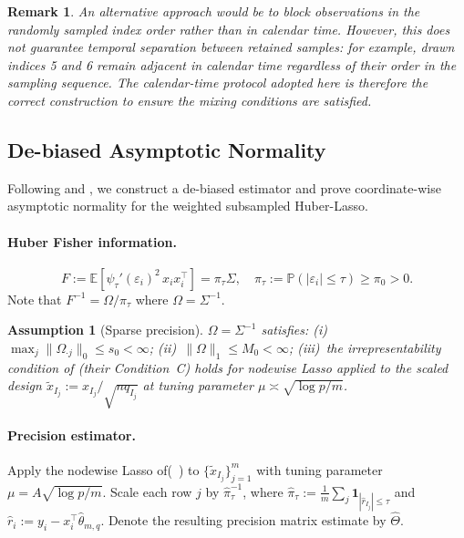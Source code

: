 \documentclass[10pt]{article}
\newtheorem{remark}[theorem]{Remark}
\newtheorem{assumption}{Assumption}
\newcommand{\E}{\mathbb{E}}
\newcommand{\Prob}{\mathbb{P}}
\newcommand{\hth}{\hat{\theta}}
\newcommand{\hTh}{\hat{\Theta}}
\begin{document}
\begin{remark}
An alternative approach would be to block observations in the randomly sampled
index order rather than in calendar time. However, this does not guarantee
temporal separation between retained samples: for example, drawn indices 5 and 6
remain adjacent in calendar time regardless of their order in the sampling
sequence. The calendar-time protocol adopted here is therefore the correct
construction to ensure the mixing conditions are satisfied.
\end{remark}

\subsection{De-biased Asymptotic Normality}
\label{subsec:debiased}

Following \citet{vandegeer2014} and \citet{javanmard2014}, we construct a
de-biased estimator and prove coordinate-wise asymptotic normality for the
weighted subsampled Huber-Lasso.

\paragraph{Huber Fisher information.}
\begin{equation}\label{eq:F}
  F := \E[\psi_\tau'(\varepsilon_i)^2\,x_ix_i^\top]
     = \pi_\tau\Sigma,\quad
  \pi_\tau:=\Prob(|\varepsilon_i|\le\tau)\ge\pi_0>0.
\end{equation}
Note that $F^{-1}=\Omega/\pi_\tau$ where $\Omega=\Sigma^{-1}$.

\begin{assumption}[Sparse precision]\label{assump:sparse_prec}
$\Omega=\Sigma^{-1}$ satisfies:
(i)~$\max_j\|\Omega_{\cdot j}\|_0\le s_0<\infty$;
(ii)~$\|\Omega\|_1\le M_0<\infty$;
(iii)~the irrepresentability condition of \citet{vandegeer2014}
(their Condition~C) holds for nodewise Lasso applied to the scaled
design $\tilde x_{I_j}:=x_{I_j}/\sqrt{nq_{I_j}}$ at tuning parameter
$\mu\asymp\sqrt{\log p/m}$.
\end{assumption}

\paragraph{Precision estimator.}
Apply the nodewise Lasso of(~\cite{vandegeer2014}) to $\{\tilde x_{I_j}\}_{j=1}^m$
with tuning parameter $\mu=A\sqrt{\log p/m}$. Scale each row $j$ by $\hat\pi_\tau^{-1}$, where
$\hat\pi_\tau:=\frac{1}{m}\sum_j\mathbf{1}_{|\hat r_{I_j}|\le\tau}$ and
$\hat r_i:=y_i-x_i^\top\hth_{m,q}$. Denote the resulting precision matrix
estimate by $\hTh$.
\end{document}
